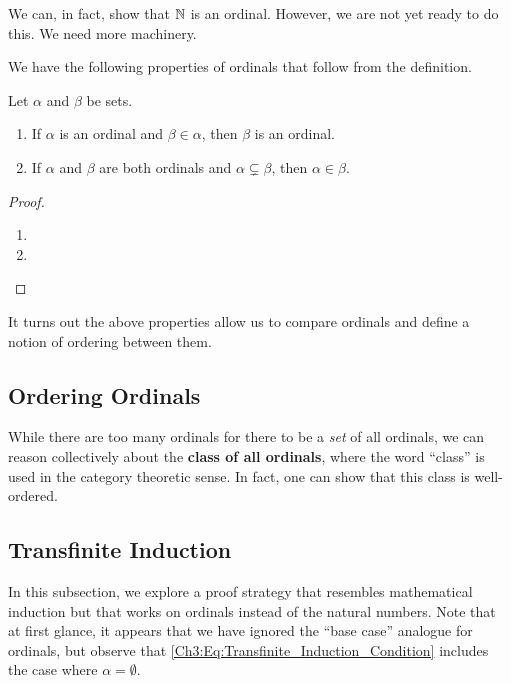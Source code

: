 We can, in fact, show that $\mathbb{N}$ is an ordinal. However, we are not yet ready to do this. We need more machinery.

We have the following properties of ordinals that follow from the definition.

\begin{boxproposition}
    Let $\alpha$ and $\beta$ be sets.
    \begin{enumerate}
        \item If $\alpha$ is an ordinal and $\beta \in \alpha$, then $\beta$ is an ordinal.
        \item If $\alpha$ and $\beta$ are both ordinals and $\alpha \subsetneq \beta$, then $\alpha \in \beta$.
    \end{enumerate}
\end{boxproposition}
\begin{proof}\hfill
    \begin{enumerate}
        \item \sorry

        \item \sorry
    \end{enumerate}
\end{proof}

It turns out the above properties allow us to compare ordinals and define a notion of ordering between them.

\subsection{Ordering Ordinals}

While there are too many ordinals for there to be a \textit{set} of all ordinals, we can reason collectively about the \textbf{class of all ordinals}, where the word ``class'' is used in the category theoretic sense.  In fact, one can show that this class is well-ordered.

\sorry

\subsection{Transfinite Induction}

In this subsection, we explore a proof strategy that resembles mathematical induction but that works on ordinals instead of the natural numbers. Note that at first glance, it appears that we have ignored the ``base case'' analogue for ordinals, but observe that \eqref{Ch3:Eq:Transfinite_Induction_Condition} includes the case where $\alpha = \emptyset$.

